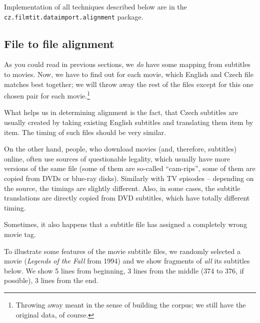 Implementation of all techniques described below are in the \texttt{cz.filmtit.dataimport.alignment} package.

\subsection{File to file alignment}

As you could read in previous sections, we \emph{do} have some mapping from subtitles to movies. Now, we have to find out for each movie, which English and Czech file matches best together; we will throw away the rest of the files except for this one chosen pair for each movie.\footnote{Throwing away meant in the sense of building the corpus; we still have the original data, of course.}


What helps us in determining alignment is the fact, that Czech subtitles are usually created by taking existing English subtitles and translating them item by item. The timing of such files should be very similar. 

On the other hand, people, who download movies (and, therefore, subtitles) online, often use sources of questionable legality, which usually have more versions of the same file (some of them are so-called ``cam-rips'', some of them are copied from DVDs or blue-ray disks). Similarly with TV episodes -- depending on the source, the timings are slightly different. Also, in some cases, the subtitle translations are directly copied from DVD subtitles, which have totally different timing.

Sometimes, it also happens that a subtitle file has assigned a completely wrong movie tag.

To illustrate some features of the movie subtitle files, we randomly selected a movie (\emph{Legends of the Fall} from 1994) and we show fragments of \emph{all} its subtitles below. We show 5 lines from beginning, 3 lines from the middle (374 to 376, if possible), 3 lines from the end.

\label{subtitledump}

\newcommand{\nicesubs}[4]{
\noindent
\begin{boxedminipage}{\textwidth}
\begin{minipage}[b]{0.24\textwidth}\footnotesize\smaller[2]{\tt
#1
}\end{minipage}
\begin{minipage}[b]{0.24\textwidth}\footnotesize\smaller[2]{\tt
#2
}\end{minipage}
\begin{minipage}[b]{0.24\textwidth}\footnotesize\smaller[2]{\tt
#3
}\end{minipage}
\begin{minipage}[b]{0.24\textwidth}\footnotesize\smaller[2]{\tt
#4
}\end{minipage}
\end{boxedminipage}
}



